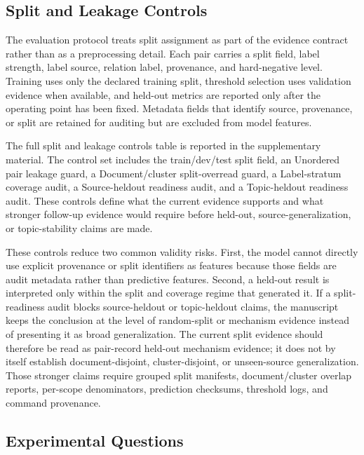 \documentclass[11pt]{article}
\begin{document}
\subsection{Split and Leakage Controls}

The evaluation protocol treats split assignment as part of the evidence contract rather than as a preprocessing detail. Each pair carries a split field, label strength, label source, relation label, provenance, and hard-negative level. Training uses only the declared training split, threshold selection uses validation evidence when available, and held-out metrics are reported only after the operating point has been fixed. Metadata fields that identify source, provenance, or split are retained for auditing but are excluded from model features.

The full split and leakage controls table is reported in the supplementary material. The control set includes the train/dev/test split field, an Unordered pair leakage guard, a Document/cluster split-overread guard, a Label-stratum coverage audit, a Source-heldout readiness audit, and a Topic-heldout readiness audit. These controls define what the current evidence supports and what stronger follow-up evidence would require before held-out, source-generalization, or topic-stability claims are made.

These controls reduce two common validity risks. First, the model cannot directly use explicit provenance or split identifiers as features because those fields are audit metadata rather than predictive features. Second, a held-out result is interpreted only within the split and coverage regime that generated it. If a split-readiness audit blocks source-heldout or topic-heldout claims, the manuscript keeps the conclusion at the level of random-split or mechanism evidence instead of presenting it as broad generalization. The current split evidence should therefore be read as pair-record held-out mechanism evidence; it does not by itself establish document-disjoint, cluster-disjoint, or unseen-source generalization. Those stronger claims require grouped split manifests, document/cluster overlap reports, per-scope denominators, prediction checksums, threshold logs, and command provenance.

\subsection{Experimental Questions}
\end{document}

